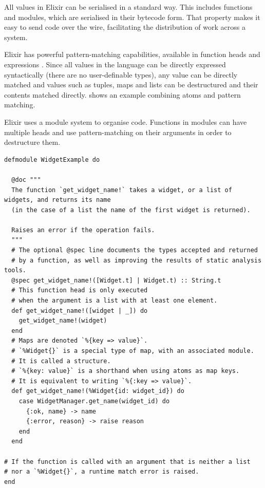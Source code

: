 All values in Elixir can be serialised in a standard way.
This includes functions and modules, which are serialised in their bytecode form.
That property makes it easy to send code over the wire, facilitating the distribution of work across a system.

Elixir has powerful pattern-matching capabilities, available in function heads and  expressions \cite[p.~13]{Thomas:2016}.
Since all values in the language can be directly expressed syntactically (there are no user-definable types), any value can be directly matched and values such as tuples, maps and lists can be destructured and their contents matched directly.
 shows an example combining atoms and pattern matching.

\begin{listing}[h]
	\caption[An example Elixir module, showcasing pattern-matching.]{Elixir uses a module system to organise code. Functions in modules can have multiple heads and use pattern-matching on their arguments in order to destructure them.}
	\label{lst:prep:pattern-matching-example}
	\begin{verbatim}
defmodule WidgetExample do

  @doc """
  The function `get_widget_name!` takes a widget, or a list of widgets, and returns its name
  (in the case of a list the name of the first widget is returned).

  Raises an error if the operation fails. 
  """
  # The optional @spec line documents the types accepted and returned
  # by a function, as well as improving the results of static analysis tools. 
  @spec get_widget_name!([Widget.t] | Widget.t) :: String.t
  # This function head is only executed
  # when the argument is a list with at least one element.
  def get_widget_name!([widget | _]) do
    get_widget_name!(widget)
  end
  # Maps are denoted `%{key => value}`.
  # `%Widget{}` is a special type of map, with an associated module.
  # It is called a structure.
  # `%{key: value}` is a shorthand when using atoms as map keys.
  # It is equivalent to writing `%{:key => value}`.  
  def get_widget_name!(%Widget{id: widget_id}) do
    case WidgetManager.get_name(widget_id) do
      {:ok, name} -> name
      {:error, reason} -> raise reason
    end
  end

# If the function is called with an argument that is neither a list
# nor a `%Widget{}`, a runtime match error is raised.
end
	\end{verbatim}
\end{listing}

